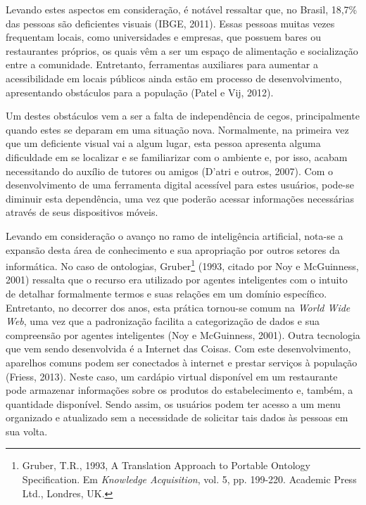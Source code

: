 Levando estes aspectos em consideração, é notável ressaltar que, no Brasil, 18,7\% das pessoas são deficientes visuais (IBGE, 2011)\nocite{IBGE2011}. Essas pessoas muitas vezes frequentam locais, como universidades e empresas, que possuem bares ou restaurantes próprios, os quais vêm a ser um espaço de alimentação e socialização entre a comunidade. Entretanto, ferramentas auxiliares para aumentar a acessibilidade em locais públicos ainda estão em processo de desenvolvimento, apresentando obstáculos para a população (Patel e Vij, 2012)\nocite{PATEL2012}.

Um destes obstáculos vem a ser a falta de independência de cegos, principalmente quando estes se deparam em uma situação nova. Normalmente, na primeira vez que um deficiente visual vai a algum lugar, esta pessoa apresenta alguma dificuldade em se localizar e se familiarizar com o ambiente e, por isso, acabam necessitando do auxílio de tutores ou amigos (D’atri e outros, 2007)\nocite{DATRI2007}. Com o desenvolvimento de uma ferramenta digital acessível para estes usuários, pode-se diminuir esta dependência, uma vez que poderão acessar informações necessárias através de seus dispositivos móveis.

Levando em consideração o avanço no ramo de inteligência artificial, nota-se a expansão desta área de conhecimento e sua apropriação por outros setores da informática. No caso de ontologias, Gruber\footnote{Gruber, T.R., 1993,  A Translation Approach to Portable Ontology Specification. Em \emph{Knowledge Acquisition}, vol. 5, pp. 199-220. Academic Press Ltd., Londres, UK.} (1993, citado por Noy e McGuinness, 2001) ressalta que o recurso era utilizado por agentes inteligentes com o intuito de detalhar formalmente termos e suas relações em um domínio específico. Entretanto, no decorrer dos anos, esta prática tornou-se comum na \textit{World Wide Web}, uma vez que a padronização facilita a categorização de dados e sua compreensão por agentes inteligentes (Noy e McGuinness, 2001)\nocite{NOY2001}. Outra tecnologia que vem sendo desenvolvida é a Internet das Coisas. Com este desenvolvimento, aparelhos comuns podem ser conectados à internet e prestar serviços à população (Friess, 2013). Neste caso, um cardápio virtual disponível em um restaurante pode armazenar informações sobre os produtos do estabelecimento e, também, a quantidade disponível. Sendo assim, os usuários podem ter acesso a um menu organizado e atualizado sem a necessidade de solicitar tais dados às pessoas em sua volta.


